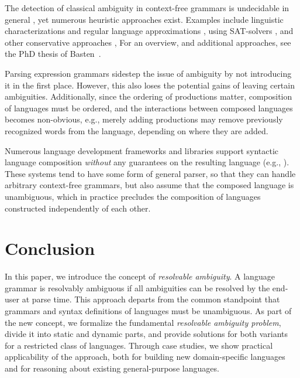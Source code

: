 \documentclass[runningheads]{llncs}
\begin{document}
The detection of classical ambiguity in context-free grammars is undecidable in general \cite{cantorAmbiguityProblemBackus1962}, yet numerous heuristic approaches exist. Examples include linguistic characterizations and regular language approximations \cite{brabrandAnalyzingAmbiguityContextFree2007}, using SAT-solvers \cite{axelssonAnalyzingContextFreeGrammars2008}, and other conservative approaches \cite{schmitzConservativeAmbiguityDetection2007}, For an overview, and additional approaches, see the PhD thesis of Basten~\cite{bastenAmbiguityDetectionProgramming2011}.

Parsing expression grammars \cite{fordParsingExpressionGrammars2004} sidestep the issue of ambiguity by not introducing it in the first place. However, this also loses the potential gains of leaving certain ambiguities. Additionally, since the ordering of productions matter, composition of languages must be ordered, and the interactions between composed languages becomes non-obvious, e.g., merely adding productions may remove previously recognized words from the language, depending on where they are added.

Numerous language development frameworks and libraries support syntactic language composition \emph{without} any guarantees on the resulting language (e.g., \cite{heeringSyntaxDefinitionFormalism1989,lorenzenSoundTypedependentSyntactic2016}). These systems tend to have some form of general parser, so that they can handle arbitrary context-free grammars, but also assume that the composed language is unambiguous, which in practice precludes the composition of languages constructed independently of each other.


\section{Conclusion}\label{sec:conclusion}
In this paper, we introduce the concept of \emph{resolvable
  ambiguity}. A language grammar is resolvably ambiguous if all
ambiguities can be resolved by the end-user at parse time. This
approach departs from the common standpoint that grammars and
syntax definitions of languages must be unambiguous.
%
As part of the new concept, we formalize the fundamental
\emph{resolvable ambiguity problem}, divide it into static and
dynamic parts, and provide solutions for both variants for a
restricted class of languages. Through case studies, we show
practical applicability of the approach, both for building new
domain-specific languages and for reasoning about existing
general-purpose languages.
\end{document}
